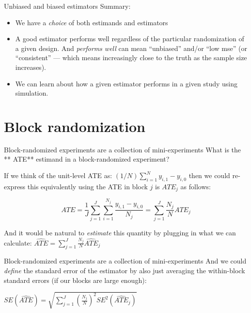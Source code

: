 \documentclass[
  ignorenonframetext,
]{beamer}
\begin{document}
\begin{frame}{Unbiased and biased estimators}
\protect\hypertarget{unbiased-and-biased-estimators}{}
Summary:

\begin{itemize}
\item
  We have a \emph{choice} of both estimands and estimators
\item
  A good estimator performs well regardless of the particular
  randomization of a given design. And \emph{performs well} can mean
  ``unbiased'' and/or ``low mse'' (or ``consistent'' --- which means
  increasingly close to the truth as the sample size increases).
\item
  We can learn about how a given estimator performs in a given study
  using simulation.
\end{itemize}
\end{frame}

\hypertarget{block-randomization}{%
\section{Block randomization}\label{block-randomization}}

\begin{frame}{Block-randomized experiments are a collection of
mini-experiments}
\protect\hypertarget{block-randomized-experiments-are-a-collection-of-mini-experiments}{}
What is the ** ATE** estimand in a block-randomized experiment?

If we think of the unit-level ATE as:
\((1/N) \sum_{i=1}^N y_{i,1} - y_{i,0}\) then we could re-express this
equivalently using the ATE in block \(j\) is \(ATE_j\) as follows:

\[
ATE = \frac{1}{J}\sum^J_{j=1} \sum^{N_j}_{i=1} \frac{y_{i,1} - y_{i,0}}{N_j}  = \sum^J_{j=1} \frac{N_j}{N} ATE_j
\]

And it would be natural to \emph{estimate} this quantity by plugging in
what we can calculate:
\(\widehat{ATE} = \displaystyle\sum^J_{j=1} \frac{N_j}{N} \widehat{ATE}_j\)
\end{frame}

\begin{frame}{Block-randomized experiments are a collection of
mini-experiments}
\protect\hypertarget{block-randomized-experiments-are-a-collection-of-mini-experiments-1}{}
And we could \emph{define} the standard error of the estimator by also
just averaging the within-block standard errors (if our blocks are large
enough):

\(SE(\widehat{ATE}) = \sqrt{\sum^J_{j=1} (\frac{N_{j}}{N})^2SE^2(\widehat{ATE}_j)}\)
\end{frame}
\end{document}
